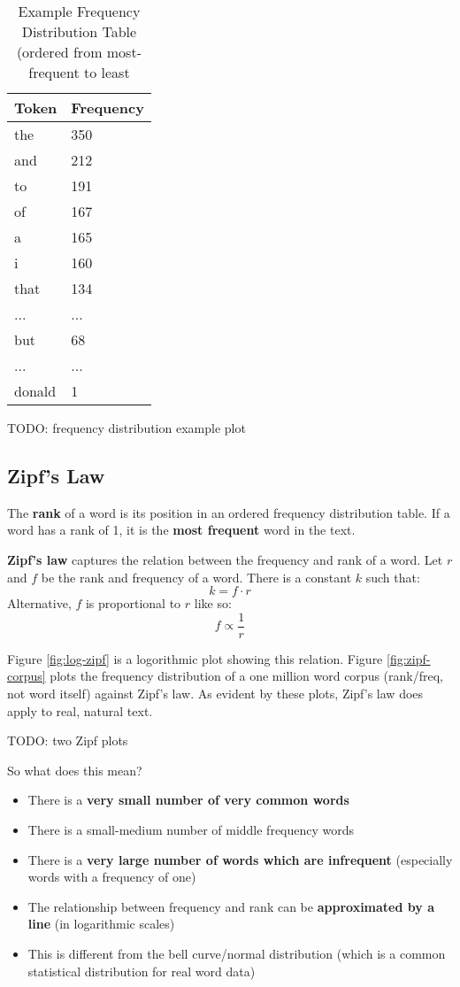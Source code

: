 \documentclass{article}
\begin{document}
\begin{table}
	\centering
	\begin{tabular}{|l|l|}
		\hline
		\textbf{Token} & \textbf{Frequency} \\
		\hline
		the & 350 \\
		and & 212 \\
		to & 191 \\
		of & 167 \\
		a & 165 \\
		i & 160 \\
		that & 134 \\
		... & ...\\
		but & 68 \\
		... & ...\\
		donald & 1 \\
		\hline
	\end{tabular}
	\caption{Example Frequency Distribution Table (ordered from most-frequent to least}
	\label{tab:freqdist}
\end{table}

TODO: frequency distribution example plot

\subsection{Zipf's Law}

The \textbf{rank} of a word is its position in an ordered frequency distribution table. If a word has a rank of 1, it is the \textbf{most frequent} word in the text.

\textbf{Zipf's law} captures the relation between the frequency and rank of a word. Let $r$ and $f$ be the rank and frequency of a word. There is a constant $k$ such that:
\begin{equation}
	k = f \cdot r
\end{equation}
Alternative, $f$ is proportional to $r$ like so:
\begin{equation}
	f \propto \frac{1}{r}
\end{equation}

Figure \ref{fig:log-zipf} is a logorithmic plot showing this relation. Figure \ref{fig:zipf-corpus} plots the frequency distribution of a one million word corpus (rank/freq, not word itself) against Zipf's law. As evident by these plots, Zipf's law does apply to real, natural text.

TODO: two Zipf plots

So what does this mean?
\begin{itemize}
	\item There is a \textbf{very small number of very common words}
	\item There is a small-medium number of middle frequency words
	\item There is a \textbf{very large number of words which are infrequent} (especially words with a frequency of one)
	\item The relationship between frequency and rank can be \textbf{approximated by a line} (in logarithmic scales)
	\item This is different from the bell curve/normal distribution (which is a common statistical distribution for real word data)
\end{itemize}
\end{document}
